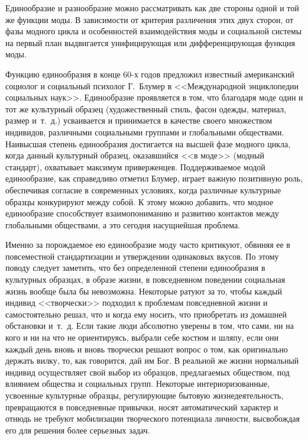   Единообразие и разнообразие можно рассматривать как две стороны одной и той
  же функции моды. В зависимости от критерия различения этих двух сторон, от
  фазы модного цикла и особенностей взаимодействия моды и социальной системы на
  первый план выдвигается унифицирующая или дифференцирующая функция моды.
  
  Функцию единообразия в конце 60-х годов предложил известный американский
  социолог и социальный психолог Г.~Блумер в <<Международной энциклопедии
  социальных наук>>. Единообразие проявляется в том, что благодаря моде один и
  тот же культурный образец (художественный стиль, фасон одежды, материал,
  размер и~т.~д.) усваивается и принимается в качестве своего множеством
  индивидов, различными социальными группами и глобальными обществами. Наивысшая
  степень единообразия достигается на высшей фазе модного цикла, когда данный
  культурный образец, оказавшийся <<в моде>> (модный стандарт), охватывает
  максимум приверженцев. Поддерживаемое модой единообразие, как справедливо
  отметил Блумер, играет важную позитивную роль, обеспечивая согласие в
  современных условиях, когда различные культурные образцы конкурируют между
  собой. К этому можно добавить, что модное единообразие способствует
  взаимопониманию и развитию контактов между глобальными обществами, а это
  сегодня насущнейшая проблема.
  
  Именно за порождаемое ею единообразие моду часто критикуют, обвиняя ее в
  повсеместной стандартизации и утверждении одинаковых вкусов. По этому поводу
  следует заметить, что без определенной степени единообразия в культурных
  образцах, в образе жизни, в повседневном поведении социальная жизнь вообще
  была бы невозможна. Некоторые ратуют за то, чтобы каждый индивид <<творчески>>
  подходил к проблемам повседневной жизни и самостоятельно решал, что и когда
  ему носить, что приобретать из домашней обстановки и~т.~д. Если такие люди
  абсолютно уверены в том, что сами, ни на кого и ни на что не ориентируясь,
  выбрали себе костюм и шляпу, если они каждый день вновь и вновь творчески
  решают вопрос о том, как оригинально держать вилку, то, как говорится, дай им
  Бог. В реальной же жизни нормальный индивид осуществляет свой выбор из
  образцов, предлагаемых обществом, под влиянием общества и социальных групп.
  Некоторые интериоризованные, усвоенные культурные образцы, регулирующие
  бытовую жизнедеятельность, превращаются в повседневные привычки, носят
  автоматический характер и отнюдь не требуют мобилизации творческого потенциала
  личности, высвобождая его для решения более серьезных задач.
  
